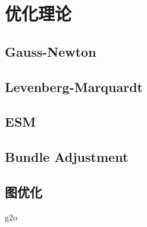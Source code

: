 \section{优化理论}
\subsection{Gauss-Newton}
\subsection{Levenberg-Marquardt}
\subsection{ESM}
\subsection{Bundle Adjustment}
\subsection{图优化}
g2o